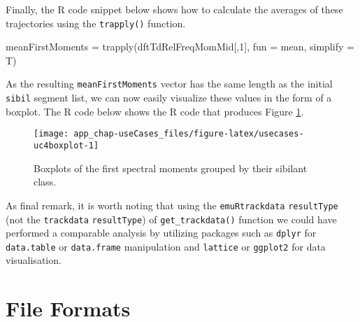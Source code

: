 \documentclass[
]{book}
\newenvironment{Shaded}{\begin{snugshade}}{\end{snugshade}}
\newcommand{\AttributeTok}[1]{\textcolor[rgb]{0.77,0.63,0.00}{#1}}
\newcommand{\DecValTok}[1]{\textcolor[rgb]{0.00,0.00,0.81}{#1}}
\newcommand{\FunctionTok}[1]{\textcolor[rgb]{0.00,0.00,0.00}{#1}}
\newcommand{\NormalTok}[1]{#1}
\newcommand{\OtherTok}[1]{\textcolor[rgb]{0.56,0.35,0.01}{#1}}
\newcommand{\SpecialCharTok}[1]{\textcolor[rgb]{0.00,0.00,0.00}{#1}}
\newcommand{\StringTok}[1]{\textcolor[rgb]{0.31,0.60,0.02}{#1}}
\begin{document}
Finally, the R code snippet below shows how to calculate the averages of these trajectories using the \texttt{trapply()} function.

\begin{Shaded}
\begin{Highlighting}[]
\NormalTok{meanFirstMoments }\OtherTok{=} \FunctionTok{trapply}\NormalTok{(dftTdRelFreqMomMid[,}\DecValTok{1}\NormalTok{],}
                           \AttributeTok{fun =}\NormalTok{ mean,}
                           \AttributeTok{simplify =}\NormalTok{ T)}
\end{Highlighting}
\end{Shaded}

As the resulting \texttt{meanFirstMoments} vector has the same length as the initial \texttt{sibil} segment list, we can now easily visualize these values in the form of a boxplot. The R code below shows the R code that produces Figure \ref{fig:usecases-uc4boxplot}.

\begin{Shaded}
\end{Shaded}

\begin{figure}

{\centering \texttt{[image: app\_chap-useCases\_files/figure-latex/usecases-uc4boxplot-1]} 

}

\caption{Boxplots of the first spectral moments grouped by their sibilant class.}\label{fig:usecases-uc4boxplot}
\end{figure}

As final remark, it is worth noting that using the \texttt{emuRtrackdata} \texttt{resultType} (not the \texttt{trackdata} \texttt{resultType}) of \texttt{get\_trackdata()} function we could have performed a comparable analysis by utilizing packages such as \texttt{dplyr} for \texttt{data.table} or \texttt{data.frame} manipulation and \texttt{lattice} or \texttt{ggplot2} for data visualisation.

\hypertarget{app-chap:fileFormats}{%
\chapter{File Formats}\label{app-chap:fileFormats}}
\end{document}
